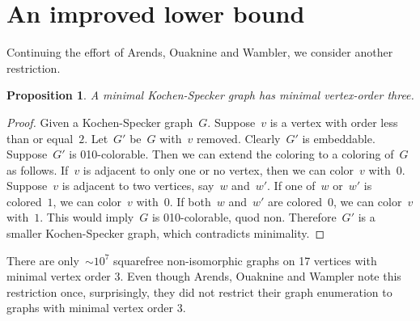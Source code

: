 \documentclass[a4paper]{article}
\newcounter{main}
\newtheorem{prop}[main]{Proposition}
\theoremstyle{definition}
\theoremstyle{remark}
\begin{document}
\section{An improved lower bound}
\label{sec:ilb}
Continuing the effort of Arends, Ouaknine and Wambler,
we consider another restriction.
\begin{prop}
    A minimal Kochen-Specker graph has minimal vertex-order three.
\end{prop}
\begin{proof}
    Given a Kochen-Specker graph~$G$.
    Suppose~$v$ is a vertex with order less than or equal~$2$.
    Let~$G'$ be~$G$ with~$v$ removed.
    Clearly~$G'$ is embeddable.
    Suppose~$G'$ is 010-colorable.
    Then we can extend the coloring to a coloring of~$G$ as follows.
    If~$v$ is adjacent to only one or no vertex,
    then we can color~$v$ with~$0$.
    Suppose~$v$ is adjacent to two vertices, say~$w$ and~$w'$.
    If one of~$w$ or~$w'$ is colored~$1$, we can color~$v$ with~$0$.
    If both~$w$ and~$w'$ are colored~$0$, we can color~$v$ with~$1$.
    This would imply~$G$ is 010-colorable, quod non.
    Therefore~$G'$ is a smaller
    Kochen-Specker graph, which contradicts minimality.
\end{proof}
There are only~${\sim}10^7$
squarefree non-isomorphic graphs on 17 vertices with minimal vertex order 3.
Even though Arends, Ouaknine and Wampler
note this restriction once,
surprisingly, they did not restrict their graph enumeration
to graphs with minimal vertex order 3.
\end{document}
